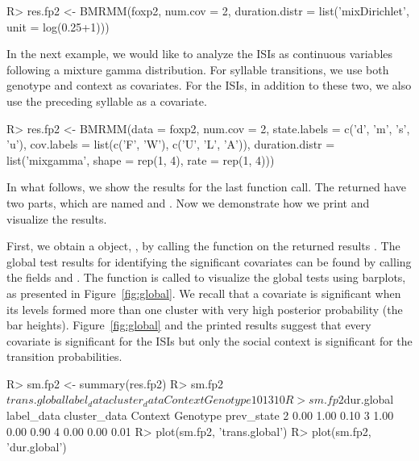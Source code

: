 \begin{example}
R> res.fp2 <- BMRMM(foxp2, num.cov = 2,  
                    duration.distr = list('mixDirichlet', unit = log(0.25+1)))
\end{example}


In the next example, we would like to analyze the ISIs as continuous variables following a mixture gamma distribution.
For syllable transitions, we use both genotype and context as covariates. 
For the ISIs, in addition to these two, we also use the preceding syllable as a covariate. 

\begin{example}
R> res.fp2 <- BMRMM(data = foxp2, num.cov = 2, state.labels = c('d', 'm', 's', 'u'), 
                    cov.labels = list(c('F', 'W'), c('U', 'L', 'A')),
                    duration.distr = list('mixgamma', shape = rep(1, 4), rate = rep(1, 4)))
\end{example}

In what follows, we show the results for the last function call.
The returned  have two parts, which are named   and .
Now we demonstrate how we print and visualize the results.  

First, we obtain a  object, ,  by calling the  function on the returned results .
The global test results for  identifying the significant covariates can be found by calling the fields  and .
The function  is called to  visualize the global tests using barplots, as presented  in Figure~\ref{fig:global}.  
{We recall that a covariate is significant when its levels formed more than one cluster with very high posterior probability (the bar heights). 
Figure~\ref{fig:global} and the printed results suggest that every covariate is significant for the ISIs but only the social context is significant for the transition probabilities. }


           
\begin{example}
R> sm.fp2 <- summary(res.fp2)
R> sm.fp2$trans.global
            label_data
cluster_data Context Genotype
           1       0        1
           3       1        0
R> sm.fp2$dur.global
            label_data
cluster_data Context Genotype prev_state
           2    0.00     1.00       0.10
           3    1.00     0.00       0.90
           4    0.00     0.00       0.01
R> plot(sm.fp2, 'trans.global')
R> plot(sm.fp2, 'dur.global')
\end{example}


